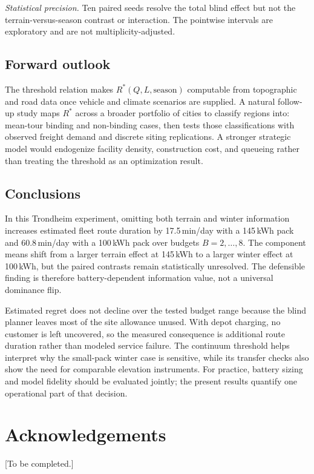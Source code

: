 \documentclass[review,3p,authoryear]{elsarticle}
\newcommand{\Rstar}{R^{*}}
\begin{document}
\emph{Statistical precision.}  Ten paired seeds resolve the total blind
effect but not the terrain-versus-season contrast or interaction.  The
pointwise intervals are exploratory and are not multiplicity-adjusted.

\subsection{Forward outlook}
\label{sec:forward}

The threshold relation makes $\Rstar(Q, L, \text{season})$ computable from
topographic and road data once vehicle and climate scenarios are supplied.
A natural follow-up study maps
$\Rstar$ across a broader portfolio of cities to classify regions into:
mean-tour binding and non-binding cases, then tests those classifications
with observed freight demand and discrete siting replications.  A stronger
strategic model would endogenize facility density, construction cost, and
queueing rather than treating the threshold as an optimization result.

\subsection{Conclusions}
\label{sec:conclusions}

In this Trondheim experiment, omitting both terrain and winter information
increases estimated fleet route duration by 17.5\,min/day with a 145\,kWh
pack and 60.8\,min/day with a 100\,kWh pack over budgets $B=2,\ldots,8$.
The component means shift from a larger terrain effect at 145\,kWh to a
larger winter effect at 100\,kWh, but the paired contrasts remain
statistically unresolved.  The defensible finding is therefore
battery-dependent information value, not a universal dominance flip.

Estimated regret does not decline over the tested budget range because the
blind planner leaves most of the site allowance unused.  With depot charging,
no customer is left uncovered, so the measured consequence is additional
route duration rather than modeled service failure.  The continuum threshold
helps interpret why the small-pack winter case is sensitive, while its
transfer checks also show the need for comparable elevation instruments.
For practice, battery sizing and model fidelity should be evaluated jointly;
the present results quantify one operational part of that decision.

\section*{Acknowledgements}
[To be completed.]
\end{document}

